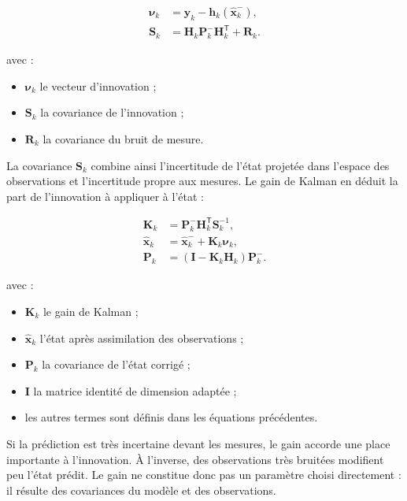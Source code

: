 \begin{align}
\boldsymbol\nu_k
&=
\mathbf y_k-\mathbf h_k(\widehat{\mathbf x}_k^-),
\\
\mathbf S_k
&=
\mathbf H_k\mathbf P_k^-\mathbf H_k^{\mathsf T}+\mathbf R_k.
\label{eq:ekf_innovation}
\end{align}

avec :

\begin{itemize}
    \item $\boldsymbol\nu_k$ le vecteur d'innovation ;
    \item $\mathbf S_k$ la covariance de l'innovation ;
    \item $\mathbf R_k$ la covariance du bruit de mesure.
\end{itemize}

La covariance $\mathbf S_k$ combine ainsi l'incertitude de l'état projetée dans
l'espace des observations et l'incertitude propre aux mesures. Le gain de
Kalman en déduit la part de l'innovation à appliquer à l'état :

\begin{align}
\mathbf K_k
&=
\mathbf P_k^-\mathbf H_k^{\mathsf T}\mathbf S_k^{-1},
\\
\widehat{\mathbf x}_k
&=
\widehat{\mathbf x}_k^-+\mathbf K_k\boldsymbol\nu_k,
\\
\mathbf P_k
&=
\left(\mathbf I-\mathbf K_k\mathbf H_k\right)\mathbf P_k^-.
\label{eq:ekf_update}
\end{align}

avec :

\begin{itemize}
    \item $\mathbf K_k$ le gain de Kalman ;
    \item $\widehat{\mathbf x}_k$ l'état après assimilation des observations ;
    \item $\mathbf P_k$ la covariance de l'état corrigé ;
    \item $\mathbf I$ la matrice identité de dimension adaptée ;
    \item les autres termes sont définis dans les équations précédentes.
\end{itemize}

Si la prédiction est très incertaine devant les mesures, le gain accorde une
place importante à l'innovation. À l'inverse, des observations très bruitées
modifient peu l'état prédit. Le gain ne constitue donc pas un paramètre choisi
directement : il résulte des covariances du modèle et des observations.

